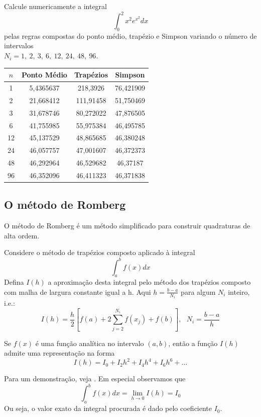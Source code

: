 \begin{ex}Calcule numericamente a integral
$$
\int_0^2 x^2 e^{x^2}dx
$$
pelas regras compostas do ponto médio, trapézio e Simpson variando o número de intervalos \\$N_i=1,\ 2,\ 3,\ 6,\ 12,\ 24,\ 48,\ 96$.
\end{ex}
\begin{sol}
  \begin{tabular}{c|ccc}\hline
    $n$ &  Ponto Médio &  Trapézios & Simpson\\ \hline
    1 & 5,4365637&218,3926&76,421909\\
2&21,668412&111,91458&51,750469\\
3&31,678746&80,272022&47,876505\\
6&41,755985&55,975384&46,495785\\
12&45,137529&48,865685&46,380248\\
24&46,057757&47,001607&46,372373\\
48&46,292964&46,529682&46,37187\\
96&46,352096&46,411323&46,371838
  \end{tabular}
\end{sol}

\subsection{O método de Romberg}
O método de Romberg é um método simplificado para construir quadraturas de alta ordem.

Considere o método de trapézios composto aplicado à integral
$$\int_a^bf(x)dx$$
Defina $I(h)$ a aproximação desta integral pelo método dos trapézios composto com  malha de largura constante igual a h. Aqui $h=\frac{b-a}{N_i}$ para algum $N_i$ inteiro, i.e.:
$$I(h)=\frac{h}{2}\left[f(a)+2\sum_{j=2}^{N_i} f(x_j)+ f(b)\right],~~~N_i=\frac{b-a}{h}$$

\begin{teo} Se $f(x)$ é uma função analítica no intervalo $(a,b)$, então a função $I(h)$ admite uma representação na forma
$$I(h)=I_0 + I_2 h^2 + I_4{h^4}+ I_6{h^6}+\ldots$$
\end{teo}
Para um demonstração, veja \cite{DEMAILLY}. Em especial observamos que
$$\int_a^b f(x)dx = \lim_{h\to 0}I(h)=I_0$$
Ou seja, o valor exato da integral procurada é dado pelo coeficiente $I_0$.

